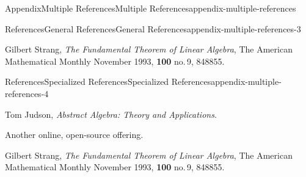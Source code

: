 \documentclass[twoside,10pt,]{article}
\numberwithin{equation}{section}
\begin{document}
\begin{appendixptx}{Appendix}{Multiple References}{}{Multiple References}{}{}{appendix-multiple-references}
%
%
\typeout{************************************************}
\typeout{************************************************}
%
\begin{references-subsection}{References}{General References}{}{General References}{}{}{appendix-multiple-references-3}
\begin{referencelist}
\hypertarget{biblio-strang-article-uno}{}Gilbert Strang, \textit{The Fundamental Theorem of Linear Algebra}, The American Mathematical Monthly November 1993, \textbf{100} no.\@\,9, 848\textendash{}855.
\end{referencelist}
\end{references-subsection}
%
%
\typeout{************************************************}
\typeout{************************************************}
%
\begin{references-subsection}{References}{Specialized References}{}{Specialized References}{}{}{appendix-multiple-references-4}
\begin{referencelist}
\hypertarget{biblio-judson-AATA}{}Tom Judson, \textit{Abstract Algebra: Theory and Applications}. \par\hypertarget{note-judson-AATA}{}%
Another online, open-source offering.%

\hypertarget{biblio-strang-article-tres}{}Gilbert Strang, \textit{The Fundamental Theorem of Linear Algebra}, The American Mathematical Monthly November 1993, \textbf{100} no.\@\,9, 848\textendash{}855.
\end{referencelist}
\end{references-subsection}
\end{appendixptx}
%
%
%
\typeout{************************************************}
\typeout{************************************************}
%
\end{document}
